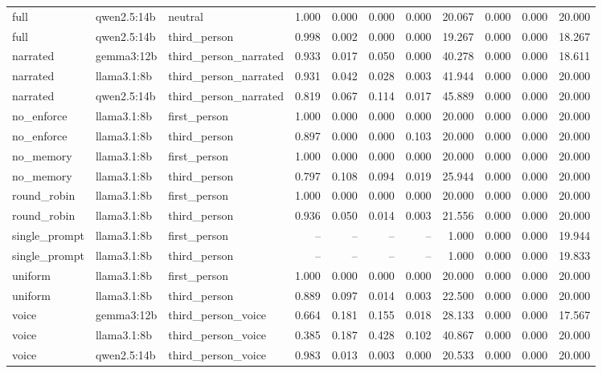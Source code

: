 \documentclass[10pt]{article}
\begin{document}
{\begin{longtable}{lllrrrrrrrr}
full & qwen2.5:14b & neutral & 1.000 & 0.000 & 0.000 & 0.000 & 20.067 & 0.000 & 0.000 & 20.000 \\
full & qwen2.5:14b & third\_person & 0.998 & 0.002 & 0.000 & 0.000 & 19.267 & 0.000 & 0.000 & 18.267 \\
narrated & gemma3:12b & third\_person\_narrated & 0.933 & 0.017 & 0.050 & 0.000 & 40.278 & 0.000 & 0.000 & 18.611 \\
narrated & llama3.1:8b & third\_person\_narrated & 0.931 & 0.042 & 0.028 & 0.003 & 41.944 & 0.000 & 0.000 & 20.000 \\
narrated & qwen2.5:14b & third\_person\_narrated & 0.819 & 0.067 & 0.114 & 0.017 & 45.889 & 0.000 & 0.000 & 20.000 \\
no\_enforce & llama3.1:8b & first\_person & 1.000 & 0.000 & 0.000 & 0.000 & 20.000 & 0.000 & 0.000 & 20.000 \\
no\_enforce & llama3.1:8b & third\_person & 0.897 & 0.000 & 0.000 & 0.103 & 20.000 & 0.000 & 0.000 & 20.000 \\
no\_memory & llama3.1:8b & first\_person & 1.000 & 0.000 & 0.000 & 0.000 & 20.000 & 0.000 & 0.000 & 20.000 \\
no\_memory & llama3.1:8b & third\_person & 0.797 & 0.108 & 0.094 & 0.019 & 25.944 & 0.000 & 0.000 & 20.000 \\
round\_robin & llama3.1:8b & first\_person & 1.000 & 0.000 & 0.000 & 0.000 & 20.000 & 0.000 & 0.000 & 20.000 \\
round\_robin & llama3.1:8b & third\_person & 0.936 & 0.050 & 0.014 & 0.003 & 21.556 & 0.000 & 0.000 & 20.000 \\
single\_prompt & llama3.1:8b & first\_person & -- & -- & -- & -- & 1.000 & 0.000 & 0.000 & 19.944 \\
single\_prompt & llama3.1:8b & third\_person & -- & -- & -- & -- & 1.000 & 0.000 & 0.000 & 19.833 \\
uniform & llama3.1:8b & first\_person & 1.000 & 0.000 & 0.000 & 0.000 & 20.000 & 0.000 & 0.000 & 20.000 \\
uniform & llama3.1:8b & third\_person & 0.889 & 0.097 & 0.014 & 0.003 & 22.500 & 0.000 & 0.000 & 20.000 \\
voice & gemma3:12b & third\_person\_voice & 0.664 & 0.181 & 0.155 & 0.018 & 28.133 & 0.000 & 0.000 & 17.567 \\
voice & llama3.1:8b & third\_person\_voice & 0.385 & 0.187 & 0.428 & 0.102 & 40.867 & 0.000 & 0.000 & 20.000 \\
voice & qwen2.5:14b & third\_person\_voice & 0.983 & 0.013 & 0.003 & 0.000 & 20.533 & 0.000 & 0.000 & 20.000 \\
\bottomrule
\end{longtable}
}
\end{document}
